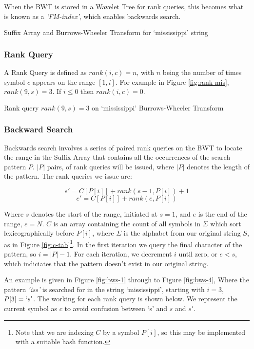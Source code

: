 When the BWT is stored in a Wavelet Tree for rank queries, this becomes what is known as a \emph{`FM-index'}, which enables backwards search.


			{Suffix Array and Burrows-Wheeler Transform for
			`mississippi' string}


\subsubsection{Rank Query}
A Rank Query is defined as $rank(i, c) = n $, with $n$ being the number of
times symbol $c$ appears on the range $[1, i]$. For example in Figure
\ref{fig:rank-mis}, $rank(9, s) = 3$. If $i \le 0$ then $rank(i, c) = 0$.

			{Rank query $rank(9, s) = 3$ on `mississippi' Burrows-Wheeler 
			Transform}

\subsubsection{Backward Search}
Backwards search involves a series of paired rank queries on the BWT to locate 
the range in the Suffix Array that contains all the occurrences of the search
pattern $P$. $|P|$ pairs, of rank queries will be issued, where $|P|$ denotes the length of the pattern. The rank queries we issue are:

					$$ s' = C[P[i]] + rank(s - 1, P[i]) + 1$$
					$$ e' = C[P[i]] + rank(e, P[i])$$

Where $s$ denotes the start of the range, initiated at $s = 1$, and $e$ is the 
end of the range, $e = N$. $C$ is an array containing the count of all symbols 
in $\Sigma$ which sort lexicographically before $P[i]$, where $\Sigma$ is the 
alphabet from our original string $S$, as in Figure 
\ref{fig:c-tab}\footnote{Note that we are indexing $C$ by a symbol $P[i]$, so 
this may be implemented with a suitable hash function.}. In the first iteration 
we query the final character of the pattern, so $i = |P| - 1$.  For each 
iteration, we decrement $i$ until zero, or $e < s$, which indiciates that
the pattern doesn't exist in our original string.

An example is given in Figure \ref{fig:bws-1} through to Figure \ref{fig:bws-4},
Where the pattern \emph{`iss'} is searched for in the string `mississippi',
starting with $i = 3$, $P[3] = `s'$. The working for each rank query is shown below. We represent the current symbol as $c$ to avoid confusion between `s' and $s$ and $s'$.

